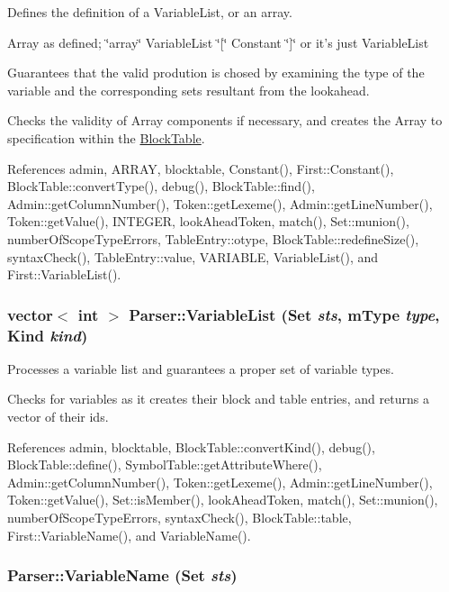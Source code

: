 Defines the definition of a VariableList, or an array. 

Array as defined; \char`\"{}array\char`\"{} VariableList \char`\"{}\mbox{[}\char`\"{} Constant \char`\"{}\mbox{]}\char`\"{} or it's just VariableList

Guarantees that the valid prodution is chosed by examining the type of the variable and the corresponding sets resultant from the lookahead.

Checks the validity of Array components if necessary, and creates the Array to specification within the \hyperlink{classBlockTable}{BlockTable}. 

References admin, ARRAY, blocktable, Constant(), First::Constant(), BlockTable::convertType(), debug(), BlockTable::find(), Admin::getColumnNumber(), Token::getLexeme(), Admin::getLineNumber(), Token::getValue(), INTEGER, lookAheadToken, match(), Set::munion(), numberOfScopeTypeErrors, TableEntry::otype, BlockTable::redefineSize(), syntaxCheck(), TableEntry::value, VARIABLE, VariableList(), and First::VariableList().

\hypertarget{classParser_a6ef905d0e7690e53c6794afdffa953cf}{
\subsubsection[{VariableList}]{\setlength{\rightskip}{0pt plus 5cm}vector$<$ int $>$ Parser::VariableList ({\bf Set} {\em sts}, \/  {\bf mType} {\em type}, \/  {\bf Kind} {\em kind})}}
\label{classParser_a6ef905d0e7690e53c6794afdffa953cf}


Processes a variable list and guarantees a proper set of variable types. 

Checks for variables as it creates their block and table entries, and returns a vector of their ids. 

References admin, blocktable, BlockTable::convertKind(), debug(), BlockTable::define(), SymbolTable::getAttributeWhere(), Admin::getColumnNumber(), Token::getLexeme(), Admin::getLineNumber(), Token::getValue(), Set::isMember(), lookAheadToken, match(), Set::munion(), numberOfScopeTypeErrors, syntaxCheck(), BlockTable::table, First::VariableName(), and VariableName().

\hypertarget{classParser_acc9e56bb590b37f7ab87395585d2f2de}{
\subsubsection[{VariableName}]{ Parser::VariableName ({\bf Set} {\em sts})}}
\label{classParser_acc9e56bb590b37f7ab87395585d2f2de}


